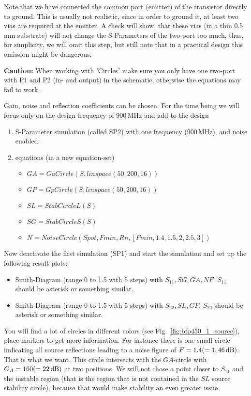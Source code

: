 Note that we have connected the common port (emitter) of the
transistor directly to ground. This is usually not realistic, since in
order to ground it, at least two vias are required at the emitter. A
check will show, that these vias (in a thin 0.5\,mm substrate) will
not change the S-Parameters of the two-port too much, thus, for
simplicity, we will omit this step, but still note that in a practical
design this omission might be dangerous.


{\bf Caution:} When working with 'Circles' make sure you only have
one two-port with P1 and P2 (in- and output) in the schematic,
otherwise the equations may fail to work.

Gain, noise and reflection coefficients can be chosen. For the
time being we will focus only on the design frequency of 900\,MHz
and add to the design
\begin{enumerate}
\item S-Parameter simulation (called SP2) with one frequency (900\,MHz), and noise
  enabled.
\item equations (in a new equation-set)
  \begin{itemize}
  \item $GA=GaCircle(S,linspace(50,200,16))$
  \item $GP=GpCircle(S,linspace(50,200,16))$
  \item $SL=StabCircleL(S)$
  \item $SG=StabCircleS(S)$
  \item $N=NoiseCircle(Spot,Fmin,Rn,[Fmin,1.4,1.5,2,2.5,3])$
  \end{itemize}
\end{enumerate}
Now deactivate the first simulation (SP1) and start the simulation and
set up the following result plots:
\begin{itemize}
\item Smith-Diagram (range 0 to 1.5 with 5 steps) with
  $S_{11},SG,GA,NF$. $S_{11}$ should be asterisk or something similar.
\item Smith-Diagram (range 0 to 1.5 with 5 steps) with
  $S_{22},SL,GP$.  $S_{22}$ should be asterisk or something similar.
\end{itemize}
You will find a lot of circles in different colors (see
Fig.~\ref{fig:bfp450_1_source}), place markers to get more
information. For instance there is one small circle indicating all
source reflections leading to a noise figure of
$F=1.4(=1,46\,\mathrm{dB})$. That is what we want. This circle
intersects with the $GA$-circle with $G_A=160(=22\,\mathrm{dB})$ at two
positions. We will not chose a point closer to $S_{11}$ and the
instable region (that is the region that is not contained in the $SL$
source stability circle), because that would make stability an even
greater issue.

